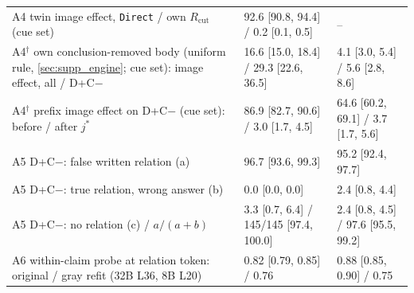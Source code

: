 \begin{tabular}{lll}
A4 twin image effect, \texttt{Direct} / own $R_\mathrm{cut}$ (cue set) & 92.6 [90.8, 94.4] / 0.2 [0.1, 0.5] & -- \\
A4$^\dagger$ own conclusion-removed body (uniform rule, \cref{sec:supp_engine}; cue set): image effect, all / D+C$-$ & 16.6 [15.0, 18.4] / 29.3 [22.6, 36.5] & 4.1 [3.0, 5.4] / 5.6 [2.8, 8.6] \\
A4$^\dagger$ prefix image effect on D+C$-$ (cue set): before / after $j^\ast$ & 86.9 [82.7, 90.6] / 3.0 [1.7, 4.5] & 64.6 [60.2, 69.1] / 3.7 [1.7, 5.6] \\
A5 D+C$-$: false written relation (a) & 96.7 [93.6, 99.3] & 95.2 [92.4, 97.7] \\
A5 D+C$-$: true relation, wrong answer (b) & 0.0 [0.0, 0.0] & 2.4 [0.8, 4.4] \\
A5 D+C$-$: no relation (c) / $a/(a+b)$ & 3.3 [0.7, 6.4] / 145/145 [97.4, 100.0] & 2.4 [0.8, 4.5] / 97.6 [95.5, 99.2] \\
A6 within-claim probe at relation token: original / gray refit (32B L36, 8B L20) & 0.82 [0.79, 0.85] / 0.76 & 0.88 [0.85, 0.90] / 0.75 \\
\bottomrule
\end{tabular}

